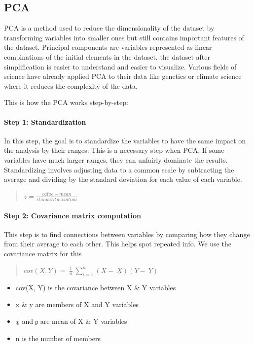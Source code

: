 
\subsection{PCA}
PCA is a method used to reduce the dimensionality of the dataset by transforming variables into smaller ones but still contains important features of the dataset. 
Principal components are variables represented as linear combinations of the initial elements in the dataset.
the dataset after simplification is easier to understand and easier to visualize. Various fields of science have already applied PCA to their data like genetics or climate science where it reduces the complexity of the data\cite*{pca}.

This is how the PCA works step-by-step:

\paragraph*{Step 1: Standardization}
In this step, the goal is to standardize the variables to have the same impact on the analysis by their ranges. This is a necessary step when PCA. If some variables have much larger ranges, they can unfairly dominate the results. Standardizing involves adjusting data to a common scale by subtracting the average and dividing by the standard deviation for each value of each variable. 
\begin{quote}

\(z = \frac{value - mean}{standard\ deviation}\)
\end{quote}

\paragraph*{Step 2: Covariance matrix computation}
This step is to find connections between variables by comparing how they change from their average to each other. This helps spot repeated info. We use the covariance matrix for this

\begin{quote}

\(cov(X,Y) = \ \frac{1}{n}\ \sum_{i=1}^{n}\left( X - \ \underline{X} \right)\left( Y - \ \underline{Y} \right)\)
\end{quote}

\begin{itemize}
    \item cov(X, Y) is the covariance between X \& Y variables
    \item x \& y are members of X and Y variables
    \item \(\underline{x}\) and\(\ \underline{y}\) are mean of X \& Y variables
    \item n is the number of members 
\end{itemize}

